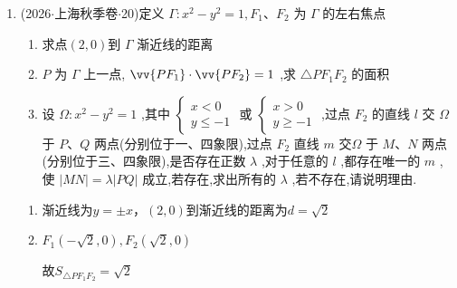 \begin{enumerate}
    \item (2026$\cdot$上海秋季卷$\cdot$20)定义 $\Gamma  : {x}^{2} - {y}^{2} = 1,{F}_{1}\text{、}{F}_{2}$ 为 $\Gamma$ 的左右焦点 
    \begin{enumerate}
        \item 求点$(2,0)$到 $\Gamma$ 渐近线的距离
        \item ${P}$ 为 $\Gamma$ 上一点, $\vv{P{F}_{1}} \cdot  \vv{P{F}_{2}} = 1$ ,求 $\bigtriangleup P{F}_{1}{F}_{2}$ 的面积
        \item 设 $\Omega  : {x}^{2} - {y}^{2} = 1$ ,其中 $\left\{  \begin{array}{l} x < 0 \\  y \leq   - 1 \end{array}\right.$ 或 $\left\{  \begin{array}{l} x > 0 \\  y \geq   - 1 \end{array}\right.$ ,过点 ${F}_{2}$ 的直线 $l$ 交 $\Omega$ 于 $P\text{、}Q$ 两点(分别位于一、四象限),过点 ${F}_{2}$ 直线 $m$ 交$\Omega$ 于 $M\text{、}N$ 两点 (分别位于三、四象限),是否存在正数 $\lambda$ ,对于任意的 $l$ ,都存在唯一的 $m$ ,使 $\left| {MN}\right|  = \lambda \left| {PQ}\right|$ 成立,若存在,求出所有的 $\lambda$ ,若不存在,请说明理由.
    \end{enumerate}
    \begin{jieda}
        \begin{enumerate}
            \item 渐近线为$y = \pm x$，$(2, 0)$到渐近线的距离为$d = \sqrt{2}$
            \item $F_1(-\sqrt{2}, 0), F_2(\sqrt{2}, 0)$
            \begin{dingautolist}{172}
                \item 设$P(x_0, y_0)$，$\vv{PF_1} \cdot \vv{PF_2} = |\vv{OP}|^2 - 2 = 1$，故$\left\{\begin{array}{l}
                     x_0^2 + y_0^2 = 3 \\
                     x_0^2 - y_0^2 = 1
                \end{array}\right.$，故$y_0 = \pm 1$
                \item 设$P\left(\dfrac{1}{cos\theta}, tan\theta\right), \theta \in \left[0, 2\pi\right)$且$\theta \neq \dfrac{\pi}{2}, \dfrac{3\pi}{2}$，则$\vv{PF_1} = \left(-\sqrt{2} - \dfrac{1}{cos\theta}, -tan\theta\right)$，$\vv{PF_2} = \left(\sqrt{2} - \dfrac{1}{cos\theta}, -tan\theta\right)$，$1 = \vv{PF_1} \cdot \vv{PF_2} = \dfrac{1}{cos^2\theta} - 2 + tan^2\theta$，即$3cos^2\theta = 1 + sin^2\theta$，即$cos^2\theta = \dfrac{1}{2}$，故$y_P = \pm 1$
            \end{dingautolist}
            故$S_{\triangle{PF_1F_2}} = \sqrt{2}$
            

\end{enumerate}
\end{jieda}
\end{enumerate}
